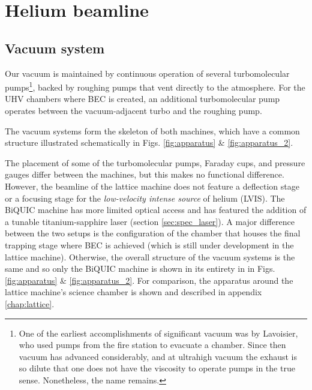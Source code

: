 \section{Helium beamline}

\subsection{Vacuum system}
	Our vacuum is maintained by continuous operation of several turbomolecular pumps\footnote{One of the earliest accomplishments of significant vacuum was by Lavoisier, who used pumps from the fire station to evacuate a chamber.
	Since then vacuum has advanced considerably, and at ultrahigh vacuum the exhaust is so dilute that one does not have the viscosity to operate pumps in the true sense.
	Nonetheless, the name remains.}, backed by roughing pumps that vent directly to the atmosphere.
	For the UHV chambers where BEC is created, an additional turbomolecular pump operates between the vacuum-adjacent turbo and the roughing pump.
	
	The vacuum systems form the skeleton of both machines, which have a common structure illustrated schematically in Figs. \ref{fig:apparatus} \& \ref{fig:apparatus_2}.


	

	The placement of some of the turbomolecular pumps, Faraday cups, and pressure gauges differ between the machines, but this makes no functional difference.
	However, the beamline of the lattice machine does not feature a deflection stage or a focusing stage for the \emph{low-velocity intense source} of helium (LVIS).
	The BiQUIC machine has more limited optical access and has featured the addition of a tunable titanium-sapphire laser (section \ref{sec:spec_laser}).
	A major difference between the two setups is the configuration of the chamber that houses the final trapping stage where BEC is achieved (which is still under development in the lattice machine).
	Otherwise, the overall structure of the vacuum systems is the same and so only the BiQUIC machine is shown in its entirety in in Figs. \ref{fig:apparatus} \& \ref{fig:apparatus_2}.
	For comparison, the apparatus around the lattice machine's science chamber is shown and described in appendix \ref{chap:lattice}.


